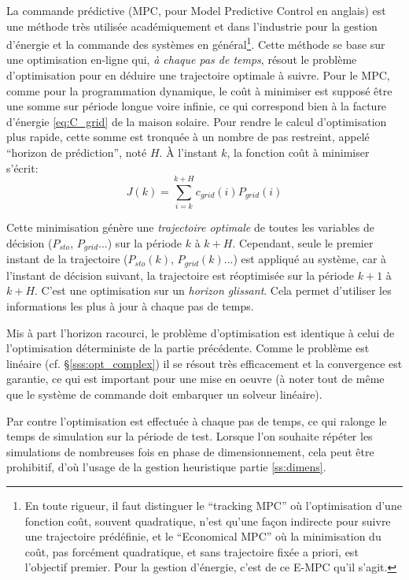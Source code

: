 \documentclass[a4paper,10pt,twocolumn]{article}
\begin{document}
La commande prédictive (MPC, pour Model Predictive Control en anglais)
est une méthode très utilisée académiquement et dans l'industrie
pour la gestion d'énergie et la commande des systèmes en général\footnote{
  En toute rigueur, il faut distinguer le
  ``tracking MPC'' où l'optimisation d'une fonction coût, souvent quadratique,
  n'est qu'une façon indirecte pour suivre une trajectoire prédéfinie,
  et le ``Economical MPC'' où la minimisation du coût, pas forcément quadratique,
  et sans trajectoire fixée a priori, est l'objectif premier.
  Pour la gestion d'énergie, c'est de ce E-MPC qu'il s'agit.}.
Cette méthode se base sur une optimisation en-ligne qui, \emph{à chaque pas de temps},
résout le problème d'optimisation pour en déduire une trajectoire optimale à suivre.
Pour le MPC, comme pour la programmation dynamique, le coût à minimiser est supposé
être une somme sur période longue voire infinie,
ce qui correspond bien à la facture d'énergie \eqref{eq:C_grid} de la maison solaire.
Pour rendre le calcul d'optimisation plus rapide,
cette somme est tronquée à un nombre de pas restreint,
appelé ``horizon de prédiction'', noté $H$.
À l'instant $k$, la fonction coût à minimiser s'écrit:
%
\begin{equation} \label{eq:mpc_cost}
  J(k) = \sum_{i=k}^{k+H} c_{grid}(i)P_{grid}(i)
\end{equation} 

Cette minimisation génère une \emph{trajectoire optimale}
de toutes les variables de décision ($P_{sto}$, $P_{grid}$...)
sur la période $k$ à $k+H$.
Cependant, seule le premier instant de la trajectoire ($P_{sto}(k)$, $P_{grid}(k)$...)
est appliqué au système, car à l'instant de décision suivant,
la trajectoire est réoptimisée sur la période $k+1$ à $k+H$.
C'est une optimisation sur un \emph{horizon glissant}.
Cela permet d'utiliser les informations les plus à jour à chaque pas de temps.

Mis à part l'horizon racourci, le problème d'optimisation
est identique à celui de l'optimisation déterministe de la partie précédente.
Comme le problème est linéaire (cf. §\ref{sss:opt_complex}) il se résout très efficacement
et la convergence est garantie, ce qui est important pour une mise en oeuvre
(à noter tout de même que le système de commande doit embarquer un solveur linéaire).

Par contre l'optimisation est effectuée à chaque pas de temps,
ce qui ralonge le temps de simulation sur la période de test.
Lorsque l'on souhaite répéter les simulations de nombreuses fois en phase
de dimensionnement, cela peut être prohibitif,
d'où l'usage de la gestion heuristique partie \ref{ss:dimens}.
\end{document}
